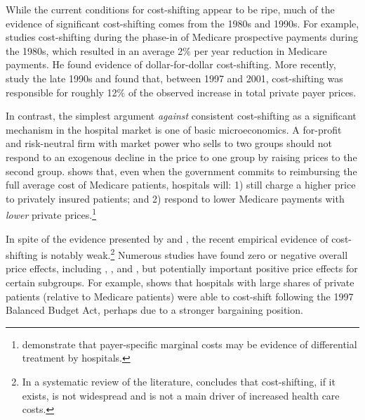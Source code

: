\documentclass[12pt]{article}
\begin{document}
While the current conditions for cost-shifting appear to be ripe, much of the evidence of significant cost-shifting comes from the 1980s and 1990s.  For example, \cite{cutler1998costshift} studies cost-shifting during the phase-in of Medicare prospective payments during the 1980s, which resulted in an average 2$\%$ per year reduction in Medicare payments.  He found evidence of dollar-for-dollar cost-shifting.  More recently, \cite{zwanziger2006} study the late 1990s and found that, between 1997 and 2001, cost-shifting was responsible for roughly 12$\%$ of the observed increase in total private payer prices.

In contrast, the simplest argument \textit{against} consistent cost-shifting as a significant mechanism in the hospital market is one of basic microeconomics.  A for-profit and risk-neutral firm with market power who sells to two groups should not respond to an exogenous decline in the price to one group by raising prices to the second group.  \cite{hay1983} shows that, even when the government commits to reimbursing the full average cost of Medicare patients, hospitals will: 1) still charge a higher price to privately insured patients; and 2) respond to lower Medicare payments with \textit{lower} private prices.\footnote{\cite{dor1996} demonstrate that payer-specific marginal costs may be evidence of differential treatment by hospitals.}

In spite of the evidence presented by \cite{cutler1998costshift} and \cite{zwanziger2006}, the recent empirical evidence of cost-shifting is notably weak.\footnote{In a systematic review of the literature, \citet{frakt2011} concludes that cost-shifting, if it exists, is not widespread and is not a main driver of increased health care costs.}  Numerous studies have found zero or negative overall price effects, including \cite{dranove2008impact}, \cite{wu2010}, and \cite{dranove2017}, but potentially important positive price effects for certain subgroups. For example, \cite{wu2010} shows that hospitals with large shares of private patients (relative to Medicare patients) were able to cost-shift following the 1997 Balanced Budget Act, perhaps due to a stronger bargaining position.
\end{document}
